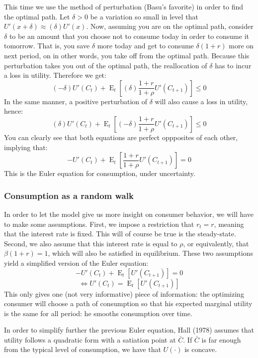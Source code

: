 \documentclass[12pt]{report}
\newcommand{\Et}[1]{\operatorname{E}_t\left[#1\right]}
\begin{document}
This time we use the method of perturbation (Basu's favorite)  in order to find the optimal path. Let $\delta > 0$ be a variation so small in level that $U'(x + \delta) \approx (\delta)U'(x)$. Now, assuming you are on the optimal path, consider $\delta$ to be an amount that you choose not to consume today in order to consume it tomorrow. That is, you save $\delta$ more today and get to consume $\delta (1+r)$ more on next period, on in other words, you take off from the optimal path. Because this perturbation takes you out of the optimal path, the reallocation of $\delta$ has to incur a loss in utility. Therefore we get: $$(-\delta)U'(C_t) + \Et{(\delta)\frac{1+r}{1+\rho}U'(C_{t+1})} \leq 0 $$  In the same manner, a positive perturbation of $\delta$ will also cause a loss in utility, hence: $$(\delta)U'(C_t) + \Et{(-\delta)\frac{1+r}{1+\rho}U'(C_{t+1})} \leq 0 $$ You can clearly see that both equations are perfect oppposites of each other, implying that: $$ - U'(C_t) + \Et{\frac{1+r}{1+\rho}U'(C_{t+1})} = 0 $$ This is the Euler equation for consumption, under uncertainty.

\subsubsection{Consumption as a random walk}

In order to let the model give us more insight on consumer behavior, we will have to make some assumptions. First, we impose a restriction that $r_t = r$, meaning that the interest rate is fixed. This will of course be true is the steady-state. Second, we also assume that this interest rate is equal to $\rho$, or equivalently, that $\beta(1+r) = 1$, which will also be satisfied in equilibrium. These two assumptions yield a simplified version of the Euler equation: $$ - U'(C_t) + \Et{U'(C_{t+1})} = 0 $$
$$\Leftrightarrow U'(C_t) = \Et{U'(C_{t+1})} $$ This only gives one (not very informative) piece of information: the optimizing consumer will choose a path of consumption so that his expected marginal utility is the same for all period: he smooths consumption over time.

In order to simplify further the previous Euler equation, Hall (1978) assumes that utility follows a quadratic form with a satiation point at $\bar C$. If $\bar C$ is far enough from the typical level of consumption, we have that $U(\cdot)$ is concave.
\end{document}
